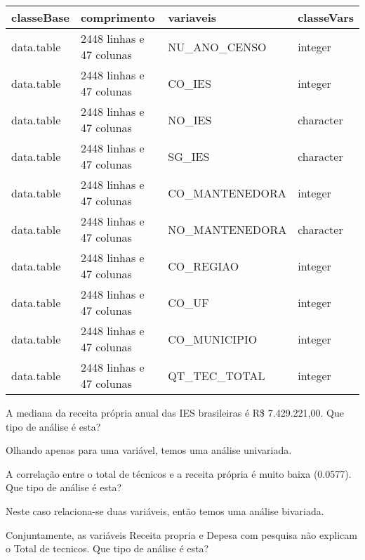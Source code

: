 \documentclass[11pt,]{style/krantz}
\theoremstyle{definition}
\theoremstyle{definition}
\theoremstyle{definition}
\theoremstyle{remark}
\let\BeginKnitrBlock\begin \let\EndKnitrBlock\end
\begin{document}
\begin{table}[!h]
\centering
\begin{tabular}{llll}
\toprule
classeBase & comprimento & variaveis & classeVars\\
\midrule
data.table & 2448 linhas e 47 colunas & NU\_ANO\_CENSO & integer\\
data.table & 2448 linhas e 47 colunas & CO\_IES & integer\\
data.table & 2448 linhas e 47 colunas & NO\_IES & character\\
data.table & 2448 linhas e 47 colunas & SG\_IES & character\\
data.table & 2448 linhas e 47 colunas & CO\_MANTENEDORA & integer\\
\addlinespace
data.table & 2448 linhas e 47 colunas & NO\_MANTENEDORA & character\\
data.table & 2448 linhas e 47 colunas & CO\_REGIAO & integer\\
data.table & 2448 linhas e 47 colunas & CO\_UF & integer\\
data.table & 2448 linhas e 47 colunas & CO\_MUNICIPIO & integer\\
data.table & 2448 linhas e 47 colunas & QT\_TEC\_TOTAL & integer\\
\bottomrule
\end{tabular}
\end{table}

\BeginKnitrBlock{exercise}
\protect\hypertarget{exr:unnamed-chunk-25}{}{\label{exr:unnamed-chunk-25} }A mediana da receita própria anual das IES brasileiras é R\$ 7.429.221,00. Que tipo de análise é esta?
\EndKnitrBlock{exercise}

\BeginKnitrBlock{solution}
\iffalse{} {Solução. } \fi{}Olhando apenas para uma variável, temos uma análise univariada.
\EndKnitrBlock{solution}

\BeginKnitrBlock{exercise}
\protect\hypertarget{exr:unnamed-chunk-27}{}{\label{exr:unnamed-chunk-27} }A correlação entre o total de técnicos e a receita própria é muito baixa (0.0577). Que tipo de análise é esta?
\EndKnitrBlock{exercise}

\BeginKnitrBlock{solution}
\iffalse{} {Solução. } \fi{}Neste caso relaciona-se duas variáveis, então temos uma análise bivariada.
\EndKnitrBlock{solution}

\BeginKnitrBlock{exercise}
\protect\hypertarget{exr:unnamed-chunk-29}{}{\label{exr:unnamed-chunk-29} }Conjuntamente, as variáveis Receita propria e Depesa com pesquisa não explicam o Total de tecnicos. Que tipo de análise é esta?
\EndKnitrBlock{exercise}
\end{document}

